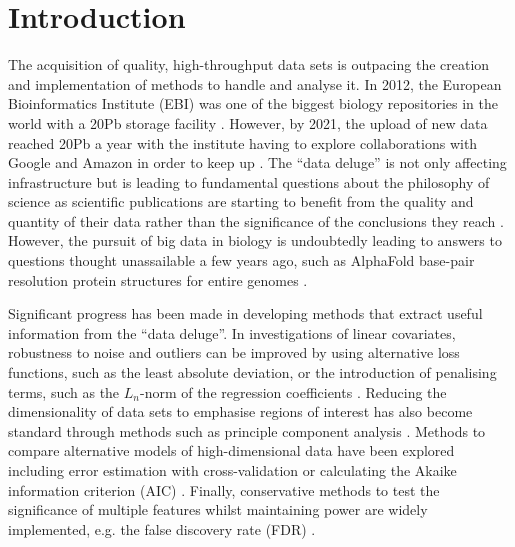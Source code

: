 \documentclass[../main.tex]{subfiles}
\begin{document}
\chapter{{Introduction}}

The acquisition of quality, high-throughput data sets is outpacing the creation and implementation of methods to handle and analyse it. 
In 2012, the European Bioinformatics Institute (EBI) was one of the biggest biology repositories in the world with a 20Pb storage facility \parencite{EBI2012}. 
However, by 2021, the upload of new data reached 20Pb a year with the institute having to explore collaborations with Google and Amazon in order to keep up \parencite{EBI2021}. 
The “data deluge” \parencite{Royal2012} is not only affecting infrastructure but is leading to fundamental questions about the philosophy of science as scientific publications are starting to benefit from the quality and quantity of their data rather than the significance of the conclusions they reach \parencite{Leonelli2019, Botstein2010}. 
However, the pursuit of big data in biology is undoubtedly leading to answers to questions thought unassailable a few years ago, such as AlphaFold base-pair resolution protein structures for entire genomes \parencite{Jumper2021}. 

Significant progress has been made in developing methods that extract useful information from the “data deluge”.
In investigations of linear covariates, robustness to noise and outliers can be improved by using alternative loss functions, such as the least absolute deviation, or the introduction of penalising terms, such as the $L_n$-norm of the regression coefficients \parencite{Wu2015}.
Reducing the dimensionality of data sets to emphasise regions of interest has also become standard through methods such as principle component analysis \parencite{Wall2005}.  
Methods to compare alternative models of high-dimensional data have been explored including error estimation with cross-validation \parencite{Molinaro2005} or calculating the Akaike information criterion (AIC) \parencite{Akaike1998}.
Finally, conservative methods to test the significance of multiple features whilst maintaining power are widely implemented, e.g. the false discovery rate (FDR) \parencite{Benjamini1995}.
\end{document}
